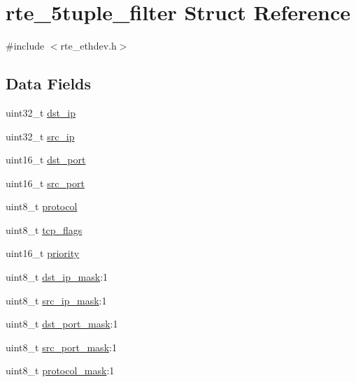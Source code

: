 \hypertarget{structrte__5tuple__filter}{}\section{rte\+\_\+5tuple\+\_\+filter Struct Reference}
\label{structrte__5tuple__filter}


{\ttfamily \#include $<$rte\+\_\+ethdev.\+h$>$}

\subsection*{Data Fields}
\begin{DoxyCompactItemize}
\item 
uint32\+\_\+t \hyperlink{structrte__5tuple__filter_a8fc1e4820a101bd4f2e1f45533e09ca5}{dst\+\_\+ip}
\item 
uint32\+\_\+t \hyperlink{structrte__5tuple__filter_aacb87cb8b0e6a2622b48ebe0553cf988}{src\+\_\+ip}
\item 
uint16\+\_\+t \hyperlink{structrte__5tuple__filter_ae18defed4756b8c15e34718f51e86e55}{dst\+\_\+port}
\item 
uint16\+\_\+t \hyperlink{structrte__5tuple__filter_ab98974981cf4c143fcee028643f313e6}{src\+\_\+port}
\item 
uint8\+\_\+t \hyperlink{structrte__5tuple__filter_ad124d3d2e02c729afa303c775295278e}{protocol}
\item 
uint8\+\_\+t \hyperlink{structrte__5tuple__filter_ab393c6d5f386ec83c49c7e1496fbb0e1}{tcp\+\_\+flags}
\item 
uint16\+\_\+t \hyperlink{structrte__5tuple__filter_a0815784d41b3c13d42ce22367abfba1d}{priority}
\item 
uint8\+\_\+t \hyperlink{structrte__5tuple__filter_a56b9fc3d42af37b6179f4cac47e6ac56}{dst\+\_\+ip\+\_\+mask}\+:1
\item 
uint8\+\_\+t \hyperlink{structrte__5tuple__filter_a24ea1adca0aeaee4b61cf17bafc9d156}{src\+\_\+ip\+\_\+mask}\+:1
\item 
uint8\+\_\+t \hyperlink{structrte__5tuple__filter_a3c1c59f1493644594dfc6e6907a97936}{dst\+\_\+port\+\_\+mask}\+:1
\item 
uint8\+\_\+t \hyperlink{structrte__5tuple__filter_ad51b4863fb71d110274060e0f6450b7b}{src\+\_\+port\+\_\+mask}\+:1
\item 
uint8\+\_\+t \hyperlink{structrte__5tuple__filter_a0ea646479ef8e5bfe19d3f48130de32a}{protocol\+\_\+mask}\+:1
\end{DoxyCompactItemize}


